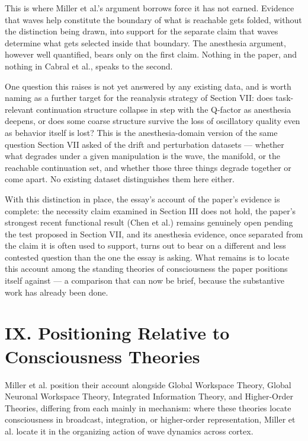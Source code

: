 \documentclass[11pt]{article}
\begin{document}
This is where Miller et al.'s argument borrows force it has not earned. Evidence that waves help constitute the boundary of what is reachable gets folded, without the distinction being drawn, into support for the separate claim that waves determine what gets selected inside that boundary. The anesthesia argument, however well quantified, bears only on the first claim. Nothing in the paper, and nothing in Cabral et al., speaks to the second.

One question this raises is not yet answered by any existing data, and is worth naming as a further target for the reanalysis strategy of Section VII: does task-relevant continuation structure collapse in step with the Q-factor as anesthesia deepens, or does some coarse structure survive the loss of oscillatory quality even as behavior itself is lost? This is the anesthesia-domain version of the same question Section VII asked of the drift and perturbation datasets — whether what degrades under a given manipulation is the wave, the manifold, or the reachable continuation set, and whether those three things degrade together or come apart. No existing dataset distinguishes them here either.

With this distinction in place, the essay's account of the paper's evidence is complete: the necessity claim examined in Section III does not hold, the paper's strongest recent functional result (Chen et al.) remains genuinely open pending the test proposed in Section VII, and its anesthesia evidence, once separated from the claim it is often used to support, turns out to bear on a different and less contested question than the one the essay is asking. What remains is to locate this account among the standing theories of consciousness the paper positions itself against — a comparison that can now be brief, because the substantive work has already been done.
\section*{IX. Positioning Relative to Consciousness Theories}

Miller et al. position their account alongside Global Workspace Theory, Global Neuronal Workspace Theory, Integrated Information Theory, and Higher-Order Theories, differing from each mainly in mechanism: where these theories locate consciousness in broadcast, integration, or higher-order representation, Miller et al. locate it in the organizing action of wave dynamics across cortex.
\end{document}
